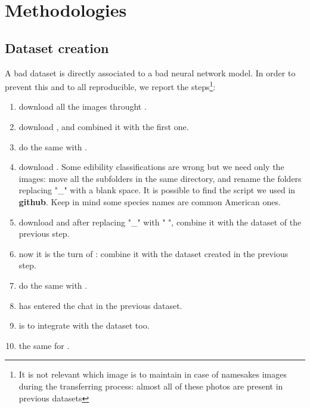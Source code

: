 \documentclass[conference]{IEEEtran}
\begin{document}
\section{Methodologies}

\subsection{Dataset creation}
A bad dataset is directly associated to a bad neural network model. In order to prevent this and to all reproducible, we report the steps\footnote{It is not relevant which image is to maintain in case of namesakes images during the transferring process: almost all of these photos are present in previous datasets}:
\begin{enumerate}
	\item download all the images throught \cite{mushroomobserver}.
	
	\item download \cite{keplab_mo106}, and combined it with the first one.
	
	\item do the same with \cite{kaggle_mushroom_species}.
	
	\item download \cite{kaggle_mushroom_classification_zedsden}. Some edibility classifications are wrong but we need only the images: move all the subfolders in the same directory, and rename the folders replacing "\_" with a blank space. It is possible to find the script we used in \textbf{github}. Keep in mind some species names are common American ones.
	
	\item download \cite{kaggle_mushroom_images_215} and after replacing "\_" with " ", combine it with the dataset of the previous step.
	
	\item now it is the turn of \cite{kaggle_mushrooms_specified}: combine it with the dataset created in the previous step.
	
	\item do the same with \cite{kaggle_edible_poisonous_mushrooms}.
	
	\item \cite{kaggle_mushroom_pictures} has entered the chat in the previous dataset.
	
	\item \cite{kaggle_mo_106} is to integrate with the dataset too.
	
	\item the same for \cite{kaggle_edible_non_edible_toxic_mushrooms}.
	

\end{enumerate}
\end{document}
